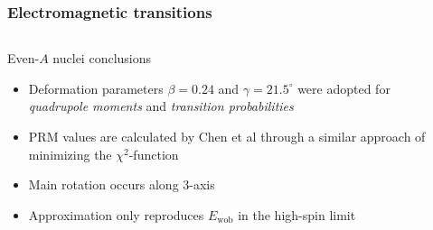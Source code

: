 \documentclass{beamer}
\begin{document}
\begin{frame}
  \frametitle{Electromagnetic transitions}
  \begin{columns}
    \begin{column}{0.72\textwidth}
      \begin{block}{Even-$A$ nuclei conclusions}
        \begin{itemize}
          \item Deformation parameters $\beta=0.24$ and $\gamma=21.5^\circ$ were adopted for \emph{quadrupole moments} and \emph{transition probabilities}
          \item \par PRM values are calculated by Chen et al through a similar approach of minimizing the $\chi^2$-function
          \item Main rotation occurs along $3$-axis
          \item Approximation only reproduces $E_\text{wob}$ in the high-spin limit
        \end{itemize}
      \end{block}
    \end{column}
    \begin{column}{0.28\textwidth}
      \begin{table}
        \centering
\end{table}
\end{column}
\end{columns}
\end{frame}
\end{document}
